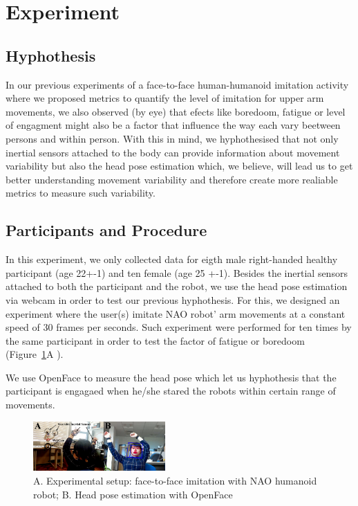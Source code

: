 \documentclass{sigchi}
\begin{document}


\section{Experiment}


\subsection{Hyphothesis}
In our previous experiments of a face-to-face human-humanoid imitation
activity \cite{XXX2017} where we proposed metrics to quantify the level of
imitation for upper arm movements, we also observed (by eye) that efects
like boredoom, fatigue or level of engagment might also be a factor that
influence the way each vary beetween persons and within person.
With this in mind, we hyphothesised that not only inertial sensors attached
to the body can provide information about movement variability
but also the head pose estimation which, we believe, will lead us to get
better understanding movement variability and therefore create more
realiable metrics to measure such variability.

\subsection{Participants and Procedure}
In this experiment, we only collected data for eigth male right-handed healthy
participant  (age 22+-1) and ten  female (age 25 +-1).
Besides the inertial sensors attached to both the participant and the robot,
we use the head pose estimation via webcam in order to test our previous hyphothesis.
For this, we designed an experiment where the user(s) imitate NAO robot' arm
movements at a constant speed of 30 frames per seconds.
Such experiment were performed for ten times by the same participant
in order to test the factor of fatigue or boredoom (Figure~\ref{fig:exp}A ).

We use OpenFace \cite{Baltrusaitis2016} to measure the head pose which
 let us hyphothesis that the participant is engagaed
when he/she stared the robots within certain range of movements.


\begin{figure}[!htb]
\centering
\includegraphics[width=0.45\textwidth]{figures/experiment/fig_w619h233}
\caption[PA]{A. Experimental setup: face-to-face imitation with NAO humanoid robot;
B. Head pose estimation with OpenFace \cite{Baltrusaitis2016}
}
\label{fig:exp}
\end{figure}
\end{document}
